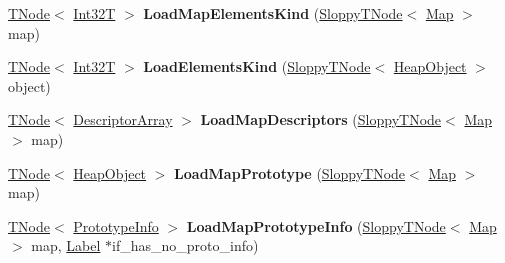 \begin{DoxyCompactItemize}
\item 
\mbox{\label{classv8_1_1internal_1_1CodeStubAssembler_a903569063d9289799dc2b382aff2286a}} 
\mbox{\hyperlink{classv8_1_1internal_1_1compiler_1_1TNode}{T\+Node}}$<$ \mbox{\hyperlink{structv8_1_1internal_1_1Int32T}{Int32T}} $>$ {\bfseries Load\+Map\+Elements\+Kind} (\mbox{\hyperlink{classv8_1_1internal_1_1compiler_1_1SloppyTNode}{Sloppy\+T\+Node}}$<$ \mbox{\hyperlink{classv8_1_1internal_1_1Map}{Map}} $>$ map)
\item 
\mbox{\label{classv8_1_1internal_1_1CodeStubAssembler_ad1828f260a3555fc7425767a26ea0226}} 
\mbox{\hyperlink{classv8_1_1internal_1_1compiler_1_1TNode}{T\+Node}}$<$ \mbox{\hyperlink{structv8_1_1internal_1_1Int32T}{Int32T}} $>$ {\bfseries Load\+Elements\+Kind} (\mbox{\hyperlink{classv8_1_1internal_1_1compiler_1_1SloppyTNode}{Sloppy\+T\+Node}}$<$ \mbox{\hyperlink{classv8_1_1internal_1_1HeapObject}{Heap\+Object}} $>$ object)
\item 
\mbox{\label{classv8_1_1internal_1_1CodeStubAssembler_a4094ac8adb2552e16c7837e185a5843d}} 
\mbox{\hyperlink{classv8_1_1internal_1_1compiler_1_1TNode}{T\+Node}}$<$ \mbox{\hyperlink{classv8_1_1internal_1_1DescriptorArray}{Descriptor\+Array}} $>$ {\bfseries Load\+Map\+Descriptors} (\mbox{\hyperlink{classv8_1_1internal_1_1compiler_1_1SloppyTNode}{Sloppy\+T\+Node}}$<$ \mbox{\hyperlink{classv8_1_1internal_1_1Map}{Map}} $>$ map)
\item 
\mbox{\label{classv8_1_1internal_1_1CodeStubAssembler_a91b02b5e9f17a048b3eed05819e9e6c4}} 
\mbox{\hyperlink{classv8_1_1internal_1_1compiler_1_1TNode}{T\+Node}}$<$ \mbox{\hyperlink{classv8_1_1internal_1_1HeapObject}{Heap\+Object}} $>$ {\bfseries Load\+Map\+Prototype} (\mbox{\hyperlink{classv8_1_1internal_1_1compiler_1_1SloppyTNode}{Sloppy\+T\+Node}}$<$ \mbox{\hyperlink{classv8_1_1internal_1_1Map}{Map}} $>$ map)
\item 
\mbox{\label{classv8_1_1internal_1_1CodeStubAssembler_a2d63ec08ebd478680252ece1bcceddb4}} 
\mbox{\hyperlink{classv8_1_1internal_1_1compiler_1_1TNode}{T\+Node}}$<$ \mbox{\hyperlink{classv8_1_1internal_1_1PrototypeInfo}{Prototype\+Info}} $>$ {\bfseries Load\+Map\+Prototype\+Info} (\mbox{\hyperlink{classv8_1_1internal_1_1compiler_1_1SloppyTNode}{Sloppy\+T\+Node}}$<$ \mbox{\hyperlink{classv8_1_1internal_1_1Map}{Map}} $>$ map, \mbox{\hyperlink{classv8_1_1internal_1_1compiler_1_1CodeAssemblerLabel}{Label}} $\ast$if\+\_\+has\+\_\+no\+\_\+proto\+\_\+info)

\end{DoxyCompactItemize}
